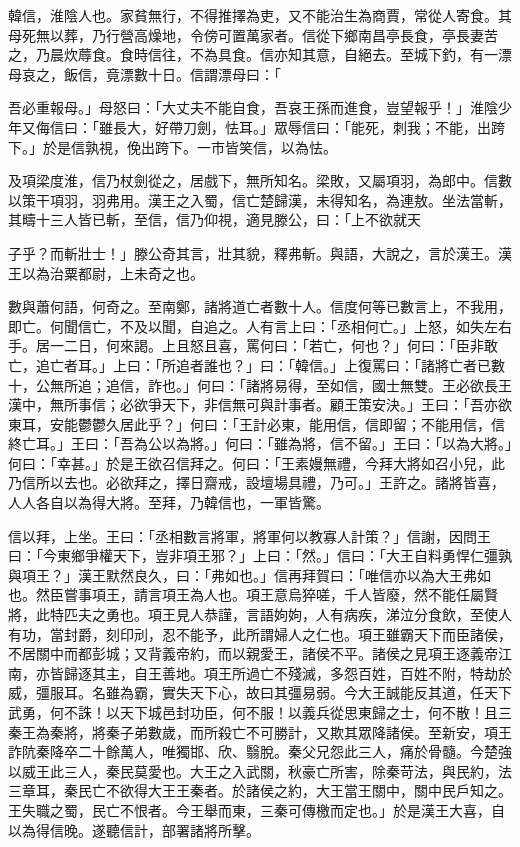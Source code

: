 
\begin{pinyinscope}
韓信，淮陰人也。家貧無行，不得推擇為吏，又不能治生為商賈，常從人寄食。其母死無以葬，乃行營高燥地，令傍可置萬家者。信從下鄉南昌亭長食，亭長妻苦之，乃晨炊蓐食。食時信往，不為具食。信亦知其意，自絕去。至城下釣，有一漂母哀之，飯信，竟漂數十日。信謂漂母曰：「

吾必重報母。」母怒曰：「大丈夫不能自食，吾哀王孫而進食，豈望報乎！」淮陰少年又侮信曰：「雖長大，好帶刀劍，怯耳。」眾辱信曰：「能死，刺我；不能，出跨下。」於是信孰視，俛出跨下。一巿皆笑信，以為怯。

及項梁度淮，信乃杖劍從之，居戲下，無所知名。梁敗，又屬項羽，為郎中。信數以策干項羽，羽弗用。漢王之入蜀，信亡楚歸漢，未得知名，為連敖。坐法當斬，其疇十三人皆已斬，至信，信乃仰視，適見滕公，曰：「上不欲就天

子乎？而斬壯士！」滕公奇其言，壯其貌，釋弗斬。與語，大說之，言於漢王。漢王以為治粟都尉，上未奇之也。

數與蕭何語，何奇之。至南鄭，諸將道亡者數十人。信度何等已數言上，不我用，即亡。何聞信亡，不及以聞，自追之。人有言上曰：「丞相何亡。」上怒，如失左右手。居一二日，何來謁。上且怒且喜，罵何曰：「若亡，何也？」何曰：「臣非敢亡，追亡者耳。」上曰：「所追者誰也？」曰：「韓信。」上復罵曰：「諸將亡者已數十，公無所追；追信，詐也。」何曰：「諸將易得，至如信，國士無雙。王必欲長王漢中，無所事信；必欲爭天下，非信無可與計事者。顧王策安決。」王曰：「吾亦欲東耳，安能鬱鬱久居此乎？」何曰：「王計必東，能用信，信即留；不能用信，信終亡耳。」王曰：「吾為公以為將。」何曰：「雖為將，信不留。」王曰：「以為大將。」何曰：「幸甚。」於是王欲召信拜之。何曰：「王素嫚無禮，今拜大將如召小兒，此乃信所以去也。必欲拜之，擇日齋戒，設壇場具禮，乃可。」王許之。諸將皆喜，人人各自以為得大將。至拜，乃韓信也，一軍皆驚。

信以拜，上坐。王曰：「丞相數言將軍，將軍何以教寡人計策？」信謝，因問王曰：「今東鄉爭權天下，豈非項王邪？」上曰：「然。」信曰：「大王自料勇悍仁彊孰與項王？」漢王默然良久，曰：「弗如也。」信再拜賀曰：「唯信亦以為大王弗如也。然臣嘗事項王，請言項王為人也。項王意烏猝嗟，千人皆廢，然不能任屬賢將，此特匹夫之勇也。項王見人恭謹，言語姁姁，人有病疾，涕泣分食飲，至使人有功，當封爵，刻印刓，忍不能予，此所謂婦人之仁也。項王雖霸天下而臣諸侯，不居關中而都彭城；又背義帝約，而以親愛王，諸侯不平。諸侯之見項王逐義帝江南，亦皆歸逐其主，自王善地。項王所過亡不殘滅，多怨百姓，百姓不附，特劫於威，彊服耳。名雖為霸，實失天下心，故曰其彊易弱。今大王誠能反其道，任天下武勇，何不誅！以天下城邑封功臣，何不服！以義兵從思東歸之士，何不散！且三秦王為秦將，將秦子弟數歲，而所殺亡不可勝計，又欺其眾降諸侯。至新安，項王詐阬秦降卒二十餘萬人，唯獨邯、欣、翳脫。秦父兄怨此三人，痛於骨髓。今楚強以威王此三人，秦民莫愛也。大王之入武關，秋豪亡所害，除秦苛法，與民約，法三章耳，秦民亡不欲得大王王秦者。於諸侯之約，大王當王關中，關中民戶知之。王失職之蜀，民亡不恨者。今王舉而東，三秦可傳檄而定也。」於是漢王大喜，自以為得信晚。遂聽信計，部署諸將所擊。


\end{pinyinscope}
